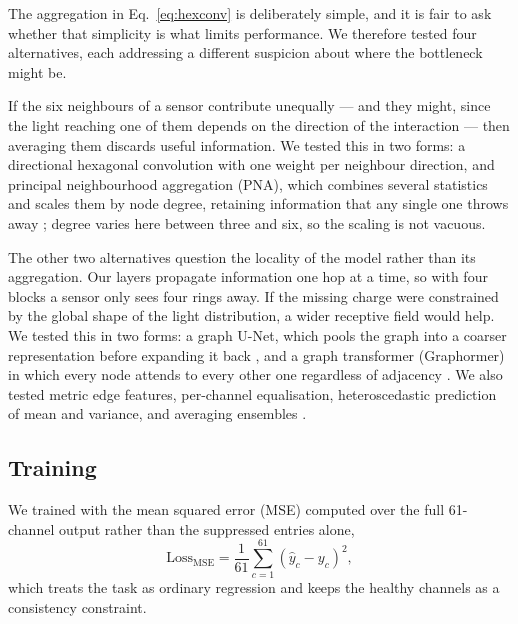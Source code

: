 \documentclass[10pt,conference]{IEEEtran}
\begin{document}
The aggregation in Eq.~\ref{eq:hexconv} is deliberately simple, and it is fair
to ask whether that simplicity is what limits performance. We therefore tested
four alternatives, each addressing a different suspicion about where the
bottleneck might be.

If the six neighbours of a sensor contribute unequally --- and they might, since
the light reaching one of them depends on the direction of the interaction ---
then averaging them discards useful information. 
We tested this in two forms: a directional hexagonal convolution with one weight per neighbour direction,
and principal neighbourhood aggregation (PNA), which combines several statistics and
scales them by node degree, retaining information that any single one throws
away \cite{corso2020pna}; degree varies here between three and six, so the
scaling is not vacuous.

The other two alternatives question the locality of the model rather than its
aggregation. Our layers propagate information one hop at a time, so with four
blocks a sensor only sees four rings away. If the missing charge were
constrained by the global shape of the light distribution, a wider receptive
field would help. We tested this in two forms: a graph U-Net, which pools the
graph into a coarser representation before expanding it back
\cite{gao2019graphunet}, and a graph transformer (Graphormer) in which every
node attends to every other one regardless of adjacency
\cite{ying2021graphormer}. We also tested metric edge features, per-channel
equalisation, heteroscedastic prediction of mean and variance, and averaging
ensembles \cite{lakshminarayanan2017ensembles}.

\subsection{Training}
\label{sec:training}

We trained with the mean squared error (MSE) computed over the full 61-channel
output rather than the suppressed entries alone,
%
\begin{equation}
\mathrm{Loss}_{\mathrm{MSE}} = \frac{1}{61} \sum_{c=1}^{61}
              \left( \hat{y}_{c} - y_{c} \right)^{2},
\label{eq:loss}
\end{equation}
%
which treats the task as ordinary regression and keeps the healthy channels as
a consistency constraint.
\end{document}

